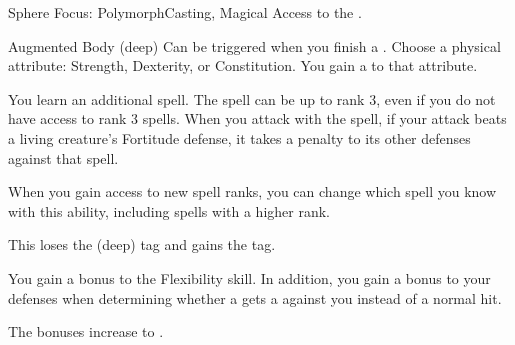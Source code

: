   \begin{magicalfeat}{Sphere Focus: Polymorph}{Casting, Magical}
    \featpre Access to the  .

    \begin{magicalattuneability}{Augmented Body}{ (deep)}
      \abilityusagetime Can be triggered when you finish a .
      \rankline
      Choose a physical attribute: Strength, Dexterity, or Constitution.
      You gain a   to that attribute.
    \end{magicalattuneability}

     You learn an additional spell.
    The spell can be up to rank 3, even if you do not have access to rank 3 spells.
    When you attack with the spell, if your attack beats a living creature's Fortitude defense, it takes a  penalty to its other defenses against that spell.

    When you gain access to new spell ranks, you can change which spell you know with this ability, including spells with a higher rank.

     This loses the  (deep) tag and gains the  tag.

     You gain a  bonus to the Flexibility skill.
    In addition, you gain a  bonus to your defenses when determining whether a  gets a  against you instead of a normal hit.

     The bonuses increase to .
  \end{magicalfeat}

